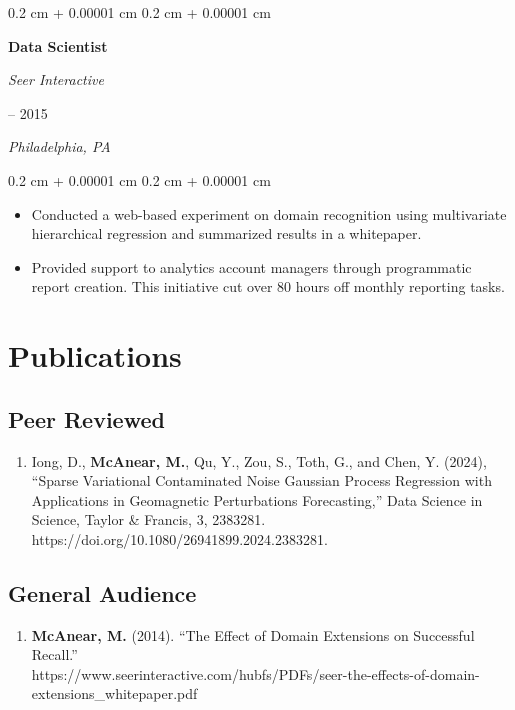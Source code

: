 \documentclass[11pt, letterpaper]{article}
\newenvironment{highlights}{
    \begin{itemize}[
        topsep=0.10 cm,
        parsep=0.10 cm,
        partopsep=0pt,
        itemsep=0pt,
        leftmargin=0.4 cm + 10pt
    ]
}{
    \end{itemize}
} %
\newenvironment{onecolentry}{
    \begin{adjustwidth}{
        0.2 cm + 0.00001 cm
    }{
        0.2 cm + 0.00001 cm
    }
}{
    \end{adjustwidth}
} %
\newenvironment{twocolentry}[2][]{
    \onecolentry
    \def\secondColumn{#2}
    \setcolumnwidth{\fill, 4.5 cm}
    \begin{paracol}{2}
}{
    \switchcolumn \raggedleft \secondColumn
    \end{paracol}
    \endonecolentry
} %
\begin{document}
\vspace{0.2 cm}
\begin{twocolentry}{
        2014 – 2015

        \textit{Philadelphia, PA}
    }
    \textbf{Data Scientist}

    \textit{Seer Interactive}
\end{twocolentry}

\begin{onecolentry}
    \begin{highlights}

        \item Conducted a web-based experiment on domain recognition using multivariate
        hierarchical regression and summarized results in a whitepaper.
        \item Provided support to analytics account managers through programmatic report
        creation. This initiative cut over 80 hours oﬀ monthly reporting tasks.
    \end{highlights}
\end{onecolentry}


\section{Publications}

\subsection{Peer Reviewed}
\begin{enumerate}
    \item Iong, D., \textbf{McAnear, M.}, Qu, Y., Zou, S., Toth, G., and Chen, Y. (2024), ``Sparse Variational Contaminated Noise Gaussian Process Regression with Applications in Geomagnetic Perturbations Forecasting,'' Data Science in Science, Taylor \& Francis, 3, 2383281. \\https://doi.org/10.1080/26941899.2024.2383281.
\end{enumerate}

\subsection{General Audience}
\begin{enumerate}
    \item \textbf{McAnear, M.} (2014). ``The Effect of Domain Extensions on Successful Recall.'' \\https://www.seerinteractive.com/hubfs/PDFs/seer-the-effects-of-domain-extensions\_whitepaper.pdf
\end{enumerate}
\end{document}
